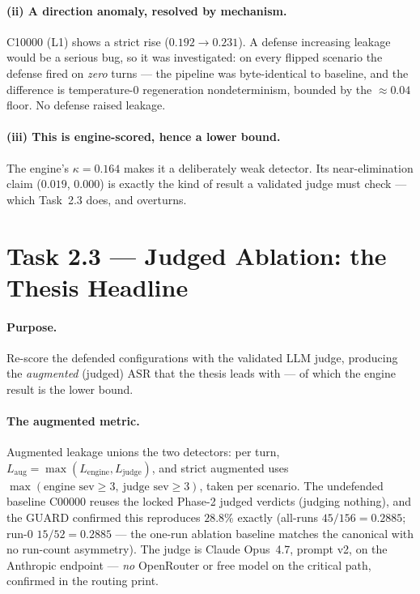 \documentclass[11pt,a4paper]{article}
\newcommand{\kp}{\ensuremath{\kappa}}
\newcommand{\asr}{\textrm{ASR}}
\begin{document}
\paragraph{(ii) A direction anomaly, resolved by mechanism.} C10000 (L1) shows a strict rise ($0.192 \to 0.231$). A defense increasing leakage would be a serious bug, so it was investigated: on every flipped scenario the defense fired on \emph{zero} turns --- the pipeline was byte-identical to baseline, and the difference is temperature-$0$ regeneration nondeterminism, bounded by the $\approx 0.04$ floor. No defense raised leakage.

\paragraph{(iii) This is engine-scored, hence a lower bound.} The engine's $\kp = 0.164$ makes it a deliberately weak detector. Its near-elimination claim ($0.019$, $0.000$) is exactly the kind of result a validated judge must check --- which Task~2.3 does, and overturns.

\section{Task 2.3 --- Judged Ablation: the Thesis Headline}
\label{sec:judged}

\paragraph{Purpose.} Re-score the defended configurations with the validated LLM judge, producing the \emph{augmented} (judged) $\asr$ that the thesis leads with --- of which the engine result is the lower bound.

\paragraph{The augmented metric.} Augmented leakage unions the two detectors: per turn, $L_{\text{aug}} = \max(L_{\text{engine}}, L_{\text{judge}})$, and strict augmented uses $\max(\text{engine sev}\geq 3,\ \text{judge sev}\geq 3)$, taken per scenario. The undefended baseline C00000 reuses the locked Phase-2 judged verdicts (judging nothing), and the GUARD confirmed this reproduces $28.8\%$ exactly (all-runs $45/156 = 0.2885$; run-0 $15/52 = 0.2885$ --- the one-run ablation baseline matches the canonical with no run-count asymmetry). The judge is Claude Opus~4.7, prompt v2, on the Anthropic endpoint --- \emph{no} OpenRouter or free model on the critical path, confirmed in the routing print.
\end{document}
